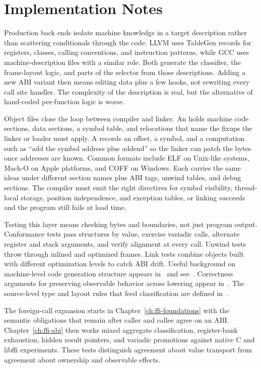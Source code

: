 \section{Implementation Notes}\label{sec:ch24-implementation}

Production back ends isolate machine knowledge in a target description rather than scattering conditionals through the code.
LLVM uses TableGen records for registers, classes, calling conventions, and instruction patterns, while GCC uses machine-description files with a similar role.
Both generate the classifier, the frame-layout logic, and parts of the selector from those descriptions.
Adding a new ABI variant then means editing data plus a few hooks, not rewriting every call site handler.
The complexity of the description is real, but the alternative of hand-coded per-function logic is worse.

Object files close the loop between compiler and linker.
An  holds machine code sections, data sections, a symbol table, and relocations that name the fixups the linker or loader must apply.
A  records an offset, a symbol, and a computation such as \enquote{add the symbol address plus addend} so the linker can patch the bytes once addresses are known.
Common formats include ELF on Unix-like systems, Mach-O on Apple platforms, and COFF on Windows.
Each carries the same ideas under different section names plus ABI tags, unwind tables, and debug sections.
The compiler must emit the right directives for symbol visibility, thread-local storage, position independence, and exception tables, or linking succeeds and the program still fails at load time.

Testing this layer means checking bytes and boundaries, not just program output.
Conformance tests pass structures by value, exercise variadic calls, alternate register and stack arguments, and verify alignment at every call.
Unwind tests throw through inlined and optimized frames.
Link tests combine objects built with different optimization levels to catch ABI drift.
Useful background on machine-level code generation structure appears in~\cite{appel-1998-modern} and see~\cite{morgan-1998-optimizing}.
Correctness arguments for preserving observable behavior across lowering appear in~\cite{safonov-2010-trustworthy}.
The source-level type and layout rules that feed classification are defined in~\cite{wg14-2011-c11}.

The foreign-call expansion starts in Chapter~\ref{ch:ffi-foundations} with the semantic obligations that remain after caller and callee agree on an ABI.
Chapter~\ref{ch:ffi-abi} then works mixed aggregate classification, register-bank exhaustion, hidden result pointers, and variadic promotions against native C and libffi experiments.
These tests distinguish agreement about value transport from agreement about ownership and observable effects.

